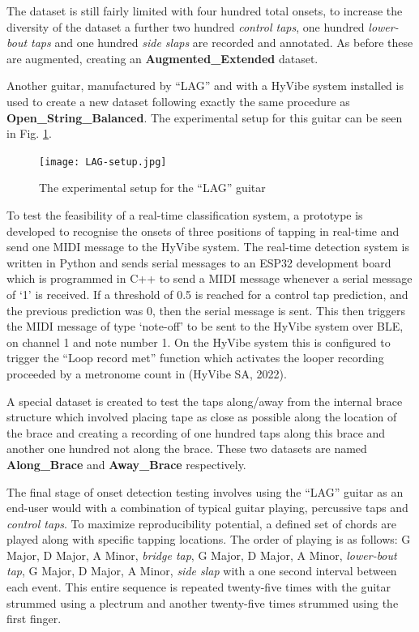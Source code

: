 \documentclass[conference]{IEEEtran}
\begin{document}
The dataset is still fairly limited with four hundred total onsets, to increase the diversity of the dataset a further two hundred \emph{control taps}, one hundred \emph{lower-bout taps} and one hundred \emph{side slaps} are recorded and annotated. As before these are augmented, creating an \textbf{Augmented\_Extended} dataset. 

Another guitar, manufactured by ``LAG'' and with a HyVibe system installed is used to create a new dataset following exactly the same procedure as \textbf{Open\_String\_Balanced}. The experimental setup for this guitar can be seen in Fig. \ref{LAG-setup}.

\begin{figure}[htbp]
    \centerline{\texttt{[image: LAG-setup.jpg]}}
    \caption{The experimental setup for the ``LAG'' guitar}
    \label{LAG-setup}
    \end{figure}

To test the feasibility of a real-time classification system, a prototype is developed to recognise the onsets of three positions of tapping in real-time and send one MIDI message to the HyVibe system.
The real-time detection system is written in Python and sends serial messages to an ESP32 development board which is programmed in C++ to send a MIDI message whenever a serial
message of `1' is received. If a threshold of 0.5 is reached for a control tap prediction, and the previous prediction was 0, then the serial message is sent.
This then triggers the MIDI message of type `note-off' to be sent to the HyVibe system over BLE, on channel 1 and note number 1. On the HyVibe system this is configured to trigger the ``Loop record met'' function
which activates the looper recording proceeded by a metronome count in (HyVibe SA, 2022).

A special dataset is created to test the taps along/away from the internal brace structure which involved placing tape as close as possible along the location of the brace and creating a recording of one hundred taps along this brace and another one hundred not along the 
brace. These two datasets are named \textbf{Along\_Brace} and \textbf{Away\_Brace} respectively. 

The final stage of onset detection testing involves using the ``LAG'' guitar as an end-user would with a combination of typical guitar playing, percussive taps and \emph{control taps}. 
To maximize reproducibility potential, a defined set of chords are played along with specific tapping locations. The order of playing is as follows: G Major, D Major, A Minor, \emph{bridge tap}, G Major, D Major, A Minor, \emph{lower-bout tap}, G Major, D Major, A Minor, \emph{side slap} with a one second interval between each event.
This entire sequence is repeated twenty-five times with the guitar strummed using a plectrum and another twenty-five times strummed using the first finger.
\end{document}
